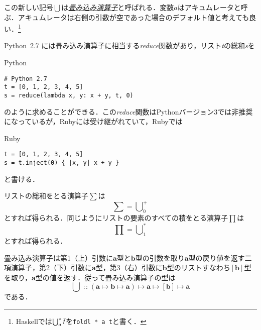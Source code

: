 \documentclass[a5paper,draft]{jsbook}
\newcommand{\programminglanguage}[1]{\textsf{#1}}
\newcommand{\haskell}{\programminglanguage{Haskell}}
\newcommand{\python}{\programminglanguage{Python}}
\newcommand{\keyword}[1]{{\underline{\emph{#1}}}}
\newcommand{\code}[1]{\texttt{#1}}
\newenvironment{pythoncode}{\begin{itembox}[r]{\python}}{\end{itembox}}
\newenvironment{rubycode}{\begin{itembox}[r]{Ruby}}{\end{itembox}}
\newcommand{\pthnId}[1]{\textit{#1}}
\newcommand{\pthnKeyword}[1]{\textbf{#1}}
\newcommand{\pthnOp}[1]{\texttt{#1}}
\newcommand{\mathTypeParameter}[1]{\mathbf{#1}}
\newcommand{\mathListType}[1]{\left[#1\right]}
\newcommand{\mathListVar}[1]{\Bar{#1}}
\DeclareMathOperator*{\mathFold}{\bigcup}
\newcommand{\mathBinaryOperator}[1]{\operatorname{#1}}
\newcommand{\mathIn}{\mathBinaryOperator{:\!:}}
\newcommand{\mathMapsTo}{\mapsto}
\newcommand{\mathMorphII}[3]{#1\mathMapsTo#2\mathMapsTo#3}
\newcommand{\mathMorphIII}[4]{#1\mathMapsTo#2\mathMapsTo#3\mathMapsTo#4}
\begin{document}
この新しい記号$\mathFold$は\keyword{畳み込み演算子}と呼ばれる．変数$a$はアキュムレータと呼ぶ．アキュムレータは右側の引数が空であった場合のデフォルト値と考えても良い．\footnote{\haskell では$\mathFold^{*}_{a}\mathListVar{t}$を\code{foldl * a t}と書く．}

\python\ 2.7 には畳み込み演算子に相当する\pthnId{reduce}関数があり，リスト\pthnId{t}の総和\pthnId{s}を
\begin{pythoncode}
\begin{verbatim}
# Python 2.7
t = [0, 1, 2, 3, 4, 5]
s = reduce(lambda x, y: x + y, t, 0)
\end{verbatim}
\end{pythoncode}
のように求めることができる．この\pthnId{reduce}関数は\python バージョン3では非推奨になっているが，Rubyには受け継がれていて，Rubyでは
\begin{rubycode}
\begin{verbatim}
t = [0, 1, 2, 3, 4, 5]
s = t.inject(0) { |x, y| x + y }
\end{verbatim}
\end{rubycode}
と書ける．

リストの総和をとる演算子$\sum$は
\begin{equation}
\sum=\mathFold^+_0
\end{equation}
とすれば得られる．同じようにリストの要素のすべての積をとる演算子$\prod$は
\begin{equation}
\prod=\mathFold^*_1
\end{equation}
とすれば得られる．

畳み込み演算子は第1（上）引数に$\mathTypeParameter{a}$型と$\mathTypeParameter{b}$型の引数を取り$\mathTypeParameter{a}$型の戻り値を返す二項演算子，第2（下）引数に$\mathTypeParameter{a}$型，第3（右）引数に$\mathTypeParameter{b}$型のリストすなわち$\mathListType{\mathTypeParameter{b}}$型を取り，$\mathTypeParameter{a}$型の値を返す．従って畳み込み演算子の型は
\begin{equation}
\mathFold\mathIn\mathMorphIII{(\mathMorphII{\mathTypeParameter{a}}{\mathTypeParameter{b}}{\mathTypeParameter{a}})}{\mathTypeParameter{a}}{\mathListType{\mathTypeParameter{b}}}{\mathTypeParameter{a}}
\end{equation}
である．
\end{document}
